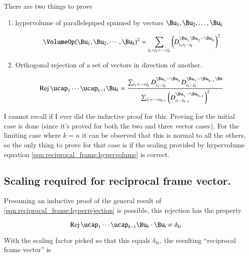 There are two things to prove

\begin{enumerate}
\item hypervolume of parallelepiped spanned by vectors $\Bu_1, \Bu_2, \dots, \Bu_k$

\begin{equation} \label{eqn:reciprocal_frame:hypervolume}
\VolumeOp{\Bu_1, \Bu_2, \cdots, \Bu_k}^2
=
\sum_{i_1 < i_2 < \cdots < i_k } \left(
D_{i_1 i_2 \cdots i_k}^{\Bu_{i_1} \Bu_{i_2} \cdots \Bu_{i_k}}
\right)^2
\end{equation}

\item Orthogonal rejection of a set of vectors in direction of another.

\begin{equation} \label{eqn:reciprocal_frame:hyperrejection}
\Rej{\ucap_1\cdots\ucap_{k-1}}{\Bu_k} = 
\frac{
\sum_{i_1 < \cdots < i_{k} } 
D_{i_1 \cdots i_{k}}^{\Bu_{i_1} \cdots \Bu_{i_{k}}}
D_{i_1 \cdots i_{k}}^{\Bu_{i_1} \cdots \Bu_{i_{k-1}} \Be }}
{
\sum_{i_1 < \cdots < i_{k-1} } \left(D_{i_1 \cdots i_{k-1}}^{\Bu_{i_1} \cdots \Bu_{i_{k-1}}}\right)^2
}
\end{equation}
\end{enumerate}

I cannot recall if I ever did the inductive proof for this.
Proving for the initial case is done (since it's proved for both the 
two and three vector cases).  For the limiting case where $k=n$ it can be observed that this is normal to all the others, so the
only thing to prove for that case is if the scaling provided by hypervolume equation \ref{eqn:reciprocal_frame:hypervolume} is correct.

\subsection{Scaling required for reciprocal frame vector. }

Presuming an inductive proof of the general result of \ref{eqn:reciprocal_frame:hyperrejection} is possible, this rejection
has the property

\begin{equation*}
\Rej{\ucap_1\cdots\ucap_{k-1}}{\Bu_k} \cdot \Bu_i \propto \delta_{ki}
\end{equation*}

With the scaling factor picked so that this equals $\delta_{ki}$, the resulting ``reciprocal frame vector'' is

